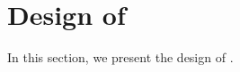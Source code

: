 
\section{Design of \tool}\label{sec:approach}


In this section, we present the design of \tool.



